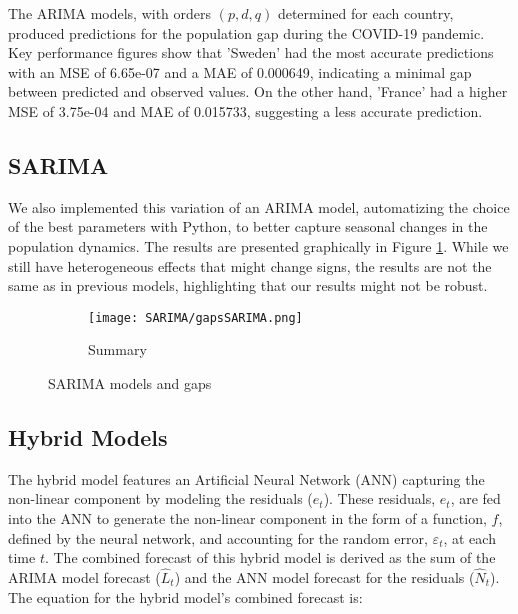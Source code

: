 \documentclass[hidelinks,11pts]{article}
\DeclareMathOperator{\1}{\mathbbm{1}}
\begin{document}
The ARIMA models, with orders $(p, d, q)$ determined for each country, produced predictions for the population gap during the COVID-19 pandemic. Key performance figures show that 'Sweden' had the most accurate predictions with an MSE of 6.65e-07 and a MAE of 0.000649, indicating a minimal gap between predicted and observed values. On the other hand, 'France' had a higher MSE of 3.75e-04 and MAE of 0.015733, suggesting a less accurate prediction.



\subsection{SARIMA}
We also implemented this variation of an ARIMA model, automatizing the choice of the best parameters with Python, to better capture seasonal changes in the population dynamics.
The results are presented graphically in Figure \ref{fig:SARIMA}. 
While we still have heterogeneous effects that might change signs, the results are not the same as in previous models, highlighting that our results might not be robust. 


\begin{figure}
    \centering
    \begin{subfigure}{0.45\textwidth}
    \texttt{[image: SARIMA/gapsSARIMA.png]}
    \caption*{Summary}
    \end{subfigure}
    \caption{SARIMA models and gaps}
    \label{fig:SARIMA}
\end{figure}


\subsection{Hybrid Models}
The hybrid model features an Artificial Neural Network (ANN) capturing the non-linear component by modeling the residuals ($e_t$). These residuals, $e_t$, are fed into the ANN to generate the non-linear component in the form of a function, $f$, defined by the neural network, and accounting for the random error, $\varepsilon_t$, at each time $t$. The combined forecast of this hybrid model is derived as the sum of the ARIMA model forecast ($\hat{L}_t$) and the ANN model forecast for the residuals ($\hat{N}_t$). The equation for the hybrid model's combined forecast is:
\end{document}
